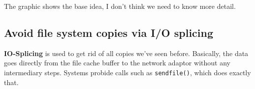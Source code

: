 The graphic shows the base idea, I don't think we need to know more detail.

\subsection{Avoid file system copies via I/O splicing}

\textbf{IO-Splicing} is used to get rid of all copies we've seen before. Basically, the data goes directly from the file cache buffer to the network adaptor without any intermediary steps. Systems probide calls such as \texttt{sendfile()}, which does exactly that.

















